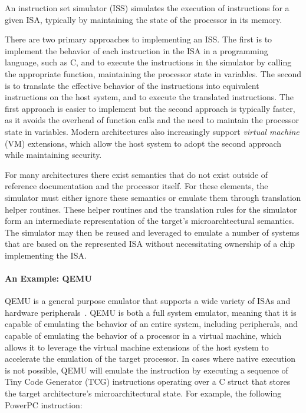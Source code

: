 An instruction set simulator (ISS) simulates the execution of instructions for a given ISA, typically by maintaining the state of the processor in its memory.

There are two primary approaches to implementing an ISS.
The first is to implement the behavior of each instruction in the ISA in a programming language, such as C, and to execute the instructions in the simulator by calling the appropriate function, maintaining the processor state in variables.
The second is to translate the effective behavior of the instructions into equivalent instructions on the host system, and to execute the translated instructions.
The first approach is easier to implement but the second approach is typically faster, as it avoids the overhead of function calls and the need to maintain the processor state in variables.
Modern architectures also increasingly support \emph{virtual machine} (VM) extensions, which allow the host system to adopt the second approach while maintaining security.

For many architectures there exist semantics that do not exist outside of reference documentation and the processor itself.
For these elements, the simulator must either ignore these semantics or emulate them through translation helper routines.
These helper routines and the translation rules for the simulator form an intermediate representation of the target's microarchtectural semantics.
The simulator may then be reused and leveraged to emulate a number of systems that are based on the represented ISA without necessitating ownership of a chip implementing the ISA.

\paragraph{An Example: QEMU}

QEMU is a general purpose emulator that supports a wide variety of ISAs and hardware peripherals~\cite{bellard2005qemu}.
QEMU is both a full system emulator, meaning that it is capable of emulating the behavior of an entire system, including peripherals, and capable of emulating the behavior of a processor in a virtual machine, which allows it to leverage the virtual machine extensions of the host system to accelerate the emulation of the target processor.
In cases where native execution is not possible, QEMU will emulate the instruction by executing a sequence of Tiny Code Generator (TCG) instructions operating over a C struct that stores the target architecture's microarchitectural state.
For example, the following PowerPC instruction:

